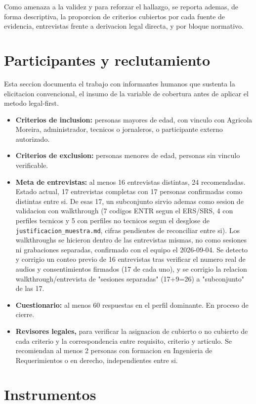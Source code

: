 \documentclass[11pt,a4paper]{article}
\begin{document}
Como amenaza a la validez y para reforzar el hallazgo, se reporta ademas, de forma descriptiva, la proporcion de criterios cubiertos por cada fuente de evidencia, entrevistas frente a derivacion legal directa, y por bloque normativo.

\section{Participantes y reclutamiento}

Esta seccion documenta el trabajo con informantes humanos que sustenta la elicitacion convencional, el insumo de la variable de cobertura antes de aplicar el metodo legal-first.

\begin{itemize}
\item \textbf{Criterios de inclusion:} personas mayores de edad, con vinculo con Agricola Moreira, administrador, tecnicos o jornaleros, o participante externo autorizado.
\item \textbf{Criterios de exclusion:} personas menores de edad, personas sin vinculo verificable.
\item \textbf{Meta de entrevistas:} al menos 16 entrevistas distintas, 24 recomendadas. Estado actual, 17 entrevistas completas con 17 personas confirmadas como distintas entre si. De esas 17, un subconjunto sirvio ademas como sesion de validacion con walkthrough (7 codigos ENTR segun el ERS/SRS, 4 con perfiles tecnicos y 5 con perfiles no tecnicos segun el desglose de \texttt{justificacion\_muestra.md}, cifras pendientes de reconciliar entre si). Los walkthroughs se hicieron dentro de las entrevistas mismas, no como sesiones ni grabaciones separadas, confirmado con el equipo el 2026-09-04. Se detecto y corrigio un conteo previo de 16 entrevistas tras verificar el numero real de audios y consentimientos firmados (17 de cada uno), y se corrigio la relacion walkthrough/entrevista de "sesiones separadas" (17+9=26) a "subconjunto" de las 17.
\item \textbf{Cuestionario:} al menos 60 respuestas en el perfil dominante. En proceso de cierre.
\item \textbf{Revisores legales,} para verificar la asignacion de cubierto o no cubierto de cada criterio y la correspondencia entre requisito, criterio y articulo. Se recomiendan al menos 2 personas con formacion en Ingenieria de Requerimientos o en derecho, independientes entre si.
\end{itemize}

\section{Instrumentos}
\end{document}

